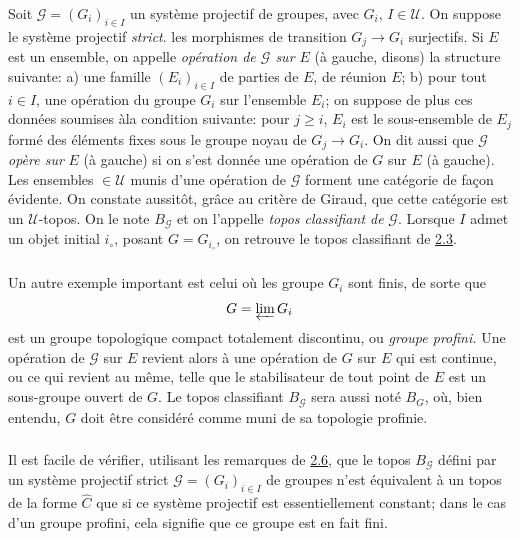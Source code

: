 \documentclass[10pt]{../fichiers-configuration-latex/smfart}
\begin{document}
\subsubsection{}
Soit $𝒢=(G_i)_{i\in I}$ un système projectif de groupes,
avec $G_i$, $I\in 𝒰$. On suppose le système projectif
\emph{strict}. \ie les morphismes de transition $G_j\rightarrow G_i$
surjectifs. Si $E$ est un ensemble, on appelle \emph{opération de
$𝒢$ sur $E$} (à gauche, disons) la structure suivante: a)
une famille $(E_i)_{i\in I}$ de parties de $E$, de réunion $E$; b)
pour tout $i\in I$, une opération du groupe $G_i$ sur l'ensemble
$E_i$; on suppose de plus ces données soumises à\pageoriginale la
condition suivante: pour $j\geq i$, $E_i$ est le sous-ensemble de
$E_j$ formé des éléments fixes sous le groupe noyau de
$G_j\rightarrow G_i$. On dit aussi que $𝒢$ \emph{opère sur}
$E$ (à gauche) si on s'est donnée une opération de $G$ sur $E$ (à
gauche). Les ensembles $\in 𝒰$ munis d'une opération de
$𝒢$ forment une catégorie de façon évidente. On constate
aussitôt, grâce au critère de Giraud, que cette catégorie est un
$𝒰$-topos. On le note $B_{𝒢}$ et on l'appelle
\emph{topos classifiant de} $𝒢$. Lorsque $I$ admet un objet
initial $i_{\circ}$, posant $G=G_{i_\circ}$, on retrouve le topos
classifiant de \hyperref[IV.subsec2.3]{2.3}.

\subsubsection{}
Un autre exemple important est celui où les groupe $G_i$ sont
finis, de sorte que
$$
G=\varprojlim G_i
$$
est un groupe topologique compact totalement discontinu, ou
\emph{groupe profini.} Une opération de $𝒢$ sur $E$
revient alors à une opération de $G$ sur $E$ qui est continue,
ou ce qui revient au même, telle que le stabilisateur de tout
point de $E$ est un sous-groupe ouvert de $G$. Le topos classifiant
$B_{𝒢}$ sera aussi noté $B_{G}$, où, bien entendu, $G$
doit être considéré comme muni de sa topologie profinie.

\subsubsection{}
Il est facile de vérifier, utilisant les remarques de
\hyperref[IV.subsec2.6]{2.6}, que le topos $B_{𝒢}$ défini par un
système projectif strict $𝒢=(G_i)_{i\in I}$ de groupes
n'est équivalent à un topos de la forme $\widehat{C}$ que si ce
système projectif est essentiellement constant; dans le cas d'un
groupe profini, cela signifie que ce groupe est en fait fini.
\end{document}
